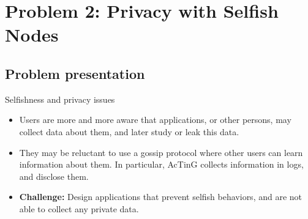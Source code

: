 \documentclass[10pt]{beamer}
\begin{document}
\section{Problem 2: Privacy with Selfish Nodes}

\subsection{Problem presentation}

\begin{frame}{Selfishness and privacy issues}{}
   \begin{itemize}
      \item Users are more and more aware that applications, or other persons, may collect data about them, and later study or leak this data. 
\vspace{5mm}
      \item They may be reluctant to use a gossip protocol where other users can learn information about them. In particular, AcTinG collects information in logs, and disclose them. 
\vspace{5mm}      
      \item \textbf{Challenge:} Design applications that prevent selfish behaviors, and are not able to collect any private data. 
   \end{itemize}
\end{frame}
\end{document}
